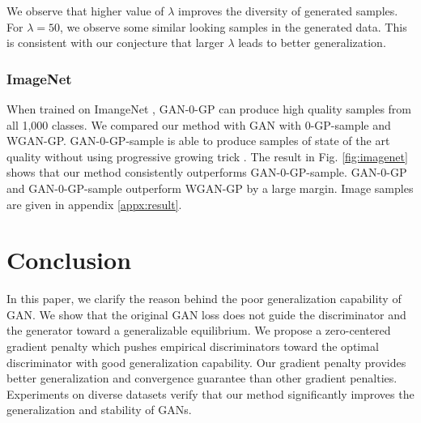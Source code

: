 \documentclass{article} %
\begin{document}
We observe that higher value of $\lambda$ improves the diversity of generated samples. For $\lambda = 50$, we observe some similar looking samples in the generated data. This is consistent with our conjecture that larger $\lambda$ leads to better generalization. %

\subsubsection*{ImageNet}
When trained on ImangeNet \citep{imagenet}, GAN-0-GP can produce high quality samples from all 1,000 classes. We compared our method with GAN with 0-GP-sample and WGAN-GP. GAN-0-GP-sample is able to produce samples of state of the art quality without using progressive growing trick \citep{progressiveGAN}. The result in Fig. \ref{fig:imagenet} shows that our method consistently outperforms GAN-0-GP-sample. GAN-0-GP and GAN-0-GP-sample outperform WGAN-GP by a large margin. Image samples are given in appendix \ref{appx:result}.

\section{Conclusion}
In this paper, we clarify the reason behind the poor generalization capability of GAN. We show that the original GAN loss does not guide the discriminator and the generator toward a generalizable equilibrium. We propose a zero-centered gradient penalty which pushes empirical discriminators toward the optimal discriminator with good generalization capability. Our gradient penalty provides better generalization and convergence guarantee than other gradient penalties. Experiments on diverse datasets verify that our method significantly improves the generalization and stability of GANs.
\end{document}
